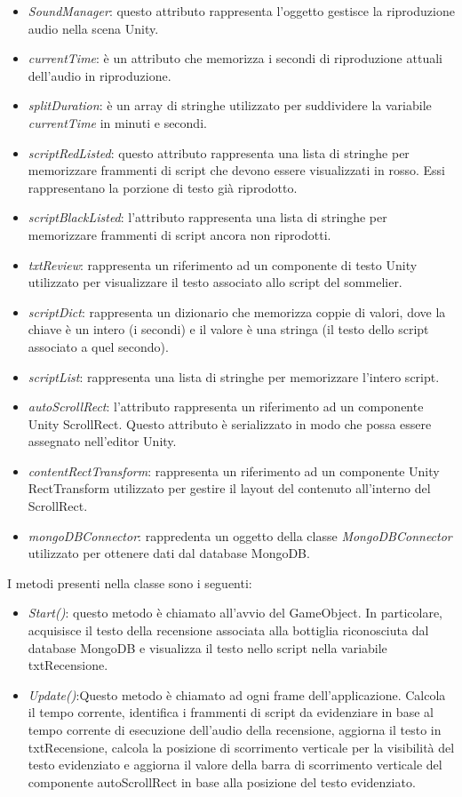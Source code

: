 \begin{itemize}
    \item \textit{SoundManager}: questo attributo rappresenta l'oggetto gestisce la riproduzione audio nella scena Unity.
    \item \textit{currentTime}: è un attributo che memorizza i secondi di riproduzione attuali dell'audio in riproduzione. 
    \item \textit{splitDuration}: è un array di stringhe utilizzato per suddividere la variabile \textit{currentTime} in minuti e secondi.
    \item \textit{scriptRedListed}: questo attributo rappresenta una lista di stringhe per memorizzare frammenti di script che devono essere visualizzati in rosso. Essi rappresentano la porzione di testo già riprodotto.
    \item \textit{scriptBlackListed}: l'attributo rappresenta una lista di stringhe per memorizzare frammenti di script ancora non riprodotti.
    \item \textit{txtReview}: rappresenta un riferimento ad un componente di testo Unity utilizzato per visualizzare il testo associato allo script del sommelier.
    \item \textit{scriptDict}: rappresenta un dizionario che memorizza coppie di valori, dove la chiave è un intero (i secondi) e il valore è una stringa (il testo dello script associato a quel secondo).
    \item \textit{scriptList}: rappresenta una lista di stringhe per memorizzare l'intero script.
    \item \textit{autoScrollRect}: l'attributo rappresenta un riferimento ad un componente Unity ScrollRect. Questo attributo è serializzato in modo che possa essere assegnato nell'editor Unity. 
    \item \textit{contentRectTransform}: rappresenta un riferimento ad un componente Unity RectTransform utilizzato per gestire il layout del contenuto all'interno del ScrollRect.
    \item \textit{mongoDBConnector}: rappredenta un oggetto della classe \textit{MongoDBConnector} utilizzato per ottenere dati dal database MongoDB.
\end{itemize}

I metodi presenti nella classe sono i seguenti:

\begin{itemize}
    \item \textit{Start()}: questo metodo è chiamato all'avvio del GameObject. In particolare, acquisisce il testo della recensione associata alla bottiglia riconosciuta dal database MongoDB e visualizza il testo nello script nella variabile txtRecensione.
    \item \textit{Update()}:Questo metodo è chiamato ad ogni frame dell'applicazione. Calcola il tempo corrente, identifica i frammenti di script da evidenziare in base al tempo corrente di esecuzione dell'audio della recensione, aggiorna il testo in txtRecensione, calcola la posizione di scorrimento verticale per la visibilità del testo evidenziato e aggiorna il valore della barra di scorrimento verticale del componente autoScrollRect in base alla posizione del testo evidenziato.
\end{itemize}

